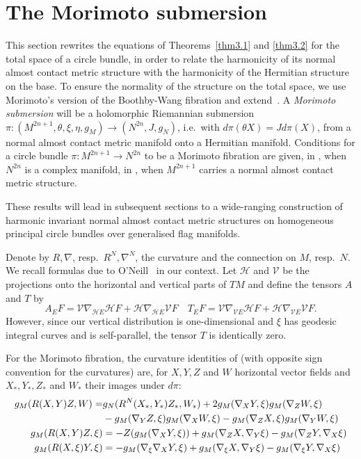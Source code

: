 \documentclass[a4paper,reqno]{amsart}
\theoremstyle{definition}
\theoremstyle{remark}
\theoremstyle{plain}
\numberwithin{equation}{section}
\newcommand{\hh}{\mathcal{H}}
\newcommand{\vv}{\mathcal{V}}
\begin{document}
\section{The Morimoto submersion} \label{sec4}

This section rewrites the equations of Theorems~\ref{thm3.1} and
\ref{thm3.2} for the total space of a circle bundle, in order to
relate the harmonicity of its normal almost contact metric
structure with the harmonicity of the Hermitian structure on the
base. To ensure the normality of the structure on the total
space, we use Morimoto's version of the Boothby-Wang fibration
and extend~\cite{VW2}.  A {\em Morimoto submersion} will be a
holomorphic Riemannian submersion
$\pi: (M^{2n+1},\theta, \xi, \eta, g_M)\longrightarrow
(N^{2n}, J, g_N)$, i.e.~with $d\pi (\theta X) = J d\pi (X)$,
from a normal almost contact metric manifold onto a Hermitian
manifold.  Conditions for a circle bundle
$\pi: M^{2n+1} \to N^{2n}$ to be a Morimoto fibration are given,
in \cite{Mor1}, when $N^{2n}$ is a complex manifold, in
\cite{Mor2}, when $M^{2n+1}$ carries a normal almost contact
metric structure.

These results will lead in subsequent sections to a wide-ranging construction of harmonic invariant normal almost contact metric structures on homogeneous principal circle bundles over generalised flag manifolds.


Denote by $R,\nabla$, resp.~$R^N,\nabla^N$,  the curvature and
the connection on $M$, resp.~$N$.
We recall formulas due to O'Neill~\cite{ONeill} in our context.
Let $\hh$ and $\vv$ be the projections onto the horizontal and
vertical parts of $TM$ and define the tensors $A$ and $T$
by
$$
A_{E} F = \vv \nabla_{\hh E} \hh F + \hh \nabla_{\hh E} \vv F \quad T_{E}F = \vv \nabla_{\vv E} \hh F + \hh \nabla_{\vv E} \vv F .
$$
However, since our vertical distribution is one-dimensional and
$\xi$ has geodesic integral curves and is self-parallel, the
tensor $T$ is identically zero.

For the Morimoto fibration, the curvature identities of
\cite{ONeill} (with opposite sign convention for the curvatures)
are, for $X,Y,Z$ and $W$ horizontal vector fields and $X_*,Y_*,Z_*$ and $W_*$ their images under $d\pi$:
\begin{align}\label{curvformul}
    g_M(R(X,Y)Z, W ) 
    = &  g_N( R^N(X_*,Y_*)Z_*, W_*) + 2 g_M(\nabla_{X}Y ,\xi)g_M(
      \nabla_{Z}W , \xi)  \\
  &-  g_M(\nabla_{Y}Z,\xi)
      g_M(\nabla_{X}W,\xi) 
    - g_M(\nabla_{Z}X, \xi) g_M(\nabla_{Y}W, \xi) \notag\\
    g_M(R(X,Y)Z, \xi ) 
    &= - Z (g_M(\nabla_{X} Y, \xi)) + g_M( \nabla_Z X, \nabla_{Y} \xi) - g_M( \nabla_Z Y, \nabla_X\xi) \notag\\
    g_M(R(X,\xi)Y, \xi ) 
&= -  g_M(\nabla_{\xi}\nabla_{X} Y,\xi) +  g_M(\nabla_{\xi} X , \nabla_{Y} \xi) -  g_M(\nabla_{\xi} Y, \nabla_{X}\xi) \notag
\end{align}
\end{document}

